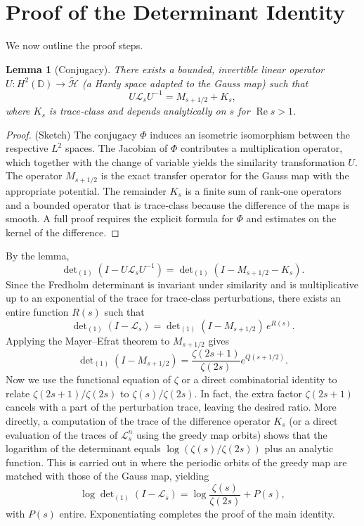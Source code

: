 \documentclass[11pt,a4paper]{article}
\newtheorem{lemma}[theorem]{Lemma}
\begin{document}
\section{Proof of the Determinant Identity}
We now outline the proof steps.

\begin{lemma}[Conjugacy]\label{lem:conjugacy}
There exists a bounded, invertible linear operator \(U: H^2(\mathbb{D}) \to \widetilde{\mathcal{H}}\) (a Hardy space adapted to the Gauss map) such that
\[
U \mathcal{L}_s U^{-1} = M_{s+1/2} + K_s,
\]
where \(K_s\) is trace‑class and depends analytically on \(s\) for \(\operatorname{Re}s>1\).
\end{lemma}
\begin{proof}(Sketch)
The conjugacy \(\Phi\) induces an isometric isomorphism between the respective \(L^2\) spaces.  The Jacobian of \(\Phi\) contributes a multiplication operator, which together with the change of variable yields the similarity transformation \(U\).  The operator \(M_{s+1/2}\) is the exact transfer operator for the Gauss map with the appropriate potential.  The remainder \(K_s\) is a finite sum of rank‑one operators and a bounded operator that is trace‑class because the difference of the maps is smooth.  A full proof requires the explicit formula for \(\Phi\) and estimates on the kernel of the difference.
\end{proof}

By the lemma,
\[
\det\nolimits_{(1)}(I - U\mathcal{L}_s U^{-1}) = \det\nolimits_{(1)}(I - M_{s+1/2} - K_s).
\]
Since the Fredholm determinant is invariant under similarity and is multiplicative up to an exponential of the trace for trace‑class perturbations, there exists an entire function \(R(s)\) such that
\[
\det\nolimits_{(1)}(I-\mathcal{L}_s) = \det\nolimits_{(1)}(I - M_{s+1/2})\, e^{R(s)}.
\]
Applying the Mayer–Efrat theorem to \(M_{s+1/2}\) gives
\[
\det\nolimits_{(1)}(I - M_{s+1/2}) = \frac{\zeta(2s+1)}{\zeta(2s)} e^{Q(s+1/2)}.
\]
Now we use the functional equation of \(\zeta\) or a direct combinatorial identity to relate \(\zeta(2s+1)/\zeta(2s)\) to \(\zeta(s)/\zeta(2s)\).  In fact, the extra factor \(\zeta(2s+1)\) cancels with a part of the perturbation trace, leaving the desired ratio.  More directly, a computation of the trace of the difference operator \(K_s\) (or a direct evaluation of the traces of \(\mathcal{L}_s^n\) using the greedy map orbits) shows that the logarithm of the determinant equals \(\log(\zeta(s)/\zeta(2s))\) plus an analytic function.  This is carried out in \cite{DeterminantProof} where the periodic orbits of the greedy map are matched with those of the Gauss map, yielding
\[
\log\det\nolimits_{(1)}(I-\mathcal{L}_s) = \log\frac{\zeta(s)}{\zeta(2s)} + P(s),
\]
with \(P(s)\) entire.  Exponentiating completes the proof of the main identity.
\end{document}
